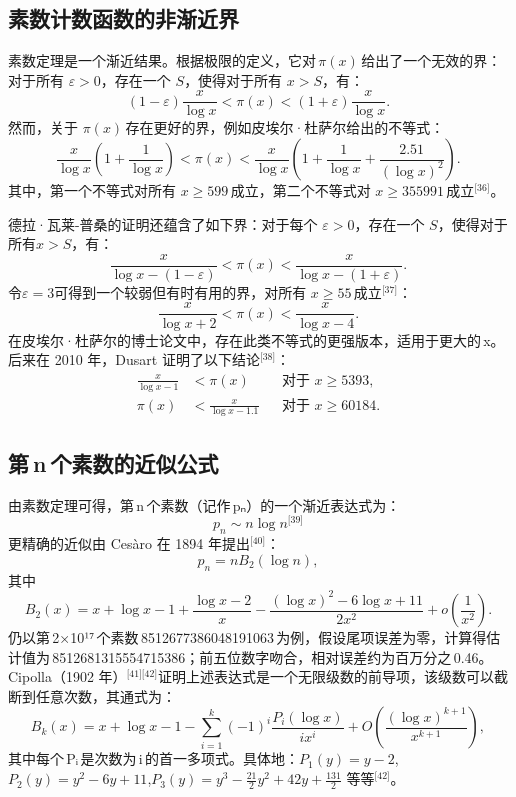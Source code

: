 \subsection{素数计数函数的非渐近界}
素数定理是一个渐近结果。根据极限的定义，它对 $\pi(x)$ 给出了一个无效的界：对于所有 $\varepsilon > 0$，存在一个 $S$，使得对于所有 $x > S$，有：
$$
(1 - \varepsilon)\frac{x}{\log x} < \pi(x) < (1 + \varepsilon)\frac{x}{\log x}.~
$$
然而，关于 $\pi(x)$ 存在更好的界，例如皮埃尔·杜萨尔给出的不等式：
$$
\frac{x}{\log x}\left(1 + \frac{1}{\log x}\right) < \pi(x) < \frac{x}{\log x}\left(1 + \frac{1}{\log x} + \frac{2.51}{(\log x)^2}\right).~
$$
其中，第一个不等式对所有 $x \geq 599$ 成立，第二个不等式对 $x \geq 355991$ 成立\(^\text{[36]}\)。

德拉·瓦莱-普桑的证明还蕴含了如下界：对于每个 $\varepsilon > 0$，存在一个 $S$，使得对于所有$x > S$，有：
$$
\frac{x}{\log x - (1 - \varepsilon)} < \pi(x) < \frac{x}{\log x - (1 + \varepsilon)}.~
$$
令$\varepsilon = 3$可得到一个较弱但有时有用的界，对所有 $x \geq 55$ 成立\(^\text{[37]}\)：
$$
\frac{x}{\log x + 2} < \pi(x) < \frac{x}{\log x - 4}.~
$$
在皮埃尔·杜萨尔的博士论文中，存在此类不等式的更强版本，适用于更大的 x。后来在 2010 年，Dusart 证明了以下结论\(^\text{[38]}\)：
$$
\begin{aligned}
\frac{x}{\log x - 1} &< \pi(x) &&\text{对于 } x \geq 5393, \\
\pi(x) &< \frac{x}{\log x - 1.1} &&\text{对于 } x \geq 60184.
\end{aligned}~
$$
\subsection{第 n 个素数的近似公式}
由素数定理可得，第 n 个素数（记作 pₙ）的一个渐近表达式为：
$$
p_n \sim n \log n^\text{[39]}~
$$
更精确的近似由 Cesàro 在 1894 年提出\(^\text{[40]}\)：
$$
p_n = n B_2(\log n),~
$$
其中
$$
B_2(x) = x + \log x - 1 + \frac{\log x - 2}{x} - \frac{(\log x)^2 - 6\log x + 11}{2x^2} + o\left(\frac{1}{x^2}\right).~
$$
仍以第 2×10¹⁷ 个素数 8512677386048191063 为例，假设尾项误差为零，计算得估计值为 8512681315554715386；前五位数字吻合，相对误差约为百万分之 0.46。Cipolla（1902 年）\(^\text{[41][42]}\)证明上述表达式是一个无限级数的前导项，该级数可以截断到任意次数，其通式为：
$$
B_k(x) = x + \log x - 1 - \sum_{i=1}^{k} (-1)^i \frac{P_i(\log x)}{i x^i} + O\left(\frac{(\log x)^{k+1}}{x^{k+1}}\right),~
$$
其中每个 Pᵢ 是次数为 i 的首一多项式。具体地：$P_1(y) = y - 2$,$P_2(y) = y^2 - 6y + 11$,$P_3(y) = y^3 - \frac{21}{2}y^2 + 42y + \frac{131}{2}$
等等\(^\text{[42]}\)。

